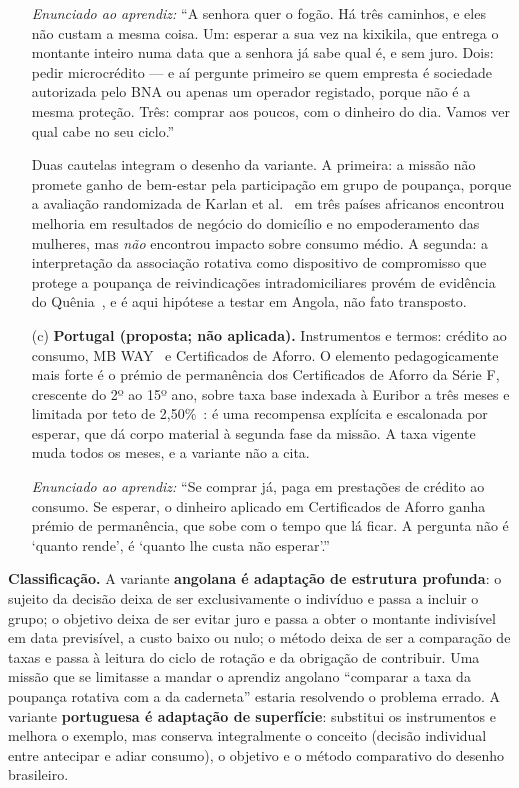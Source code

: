 \begin{enumerate}
\noindent\textit{Enunciado ao aprendiz:} ``A senhora quer o fogão. Há três caminhos, e eles não custam a mesma coisa. Um: esperar a sua vez na kixikila, que entrega o montante inteiro numa data que a senhora já sabe qual é, e sem juro. Dois: pedir microcrédito --- e aí pergunte primeiro se quem empresta é sociedade autorizada pelo BNA ou apenas um operador registado, porque não é a mesma proteção. Três: comprar aos poucos, com o dinheiro do dia. Vamos ver qual cabe no seu ciclo.''

Duas cautelas integram o desenho da variante. A primeira: a missão não promete ganho de bem-estar pela participação em grupo de poupança, porque a avaliação randomizada de Karlan et al.~\cite{karlan2017} em três países africanos encontrou melhoria em resultados de negócio do domicílio e no empoderamento das mulheres, mas \emph{não} encontrou impacto sobre consumo médio. A segunda: a interpretação da associação rotativa como dispositivo de compromisso que protege a poupança de reivindicações intradomiciliares provém de evidência do Quênia~\cite{anderson2002}, e é aqui hipótese a testar em Angola, não fato transposto.

\item[(c)] \textbf{Portugal (proposta; não aplicada).} Instrumentos e termos: crédito ao consumo, MB WAY~\cite{sibs_mbway} e Certificados de Aforro. O elemento pedagogicamente mais forte é o prémio de permanência dos Certificados de Aforro da Série F, crescente do 2º ao 15º ano, sobre taxa base indexada à Euribor a três meses e limitada por teto de 2,50\%~\cite{igcp_aforro}: é uma recompensa explícita e escalonada por esperar, que dá corpo material à segunda fase da missão. A taxa vigente muda todos os meses, e a variante não a cita.

\noindent\textit{Enunciado ao aprendiz:} ``Se comprar já, paga em prestações de crédito ao consumo. Se esperar, o dinheiro aplicado em Certificados de Aforro ganha prémio de permanência, que sobe com o tempo que lá ficar. A pergunta não é `quanto rende', é `quanto lhe custa não esperar'.''
\end{enumerate}

\noindent\textbf{Classificação.} A variante \textbf{angolana é adaptação de estrutura profunda}: o sujeito da decisão deixa de ser exclusivamente o indivíduo e passa a incluir o grupo; o objetivo deixa de ser evitar juro e passa a obter o montante indivisível em data previsível, a custo baixo ou nulo; o método deixa de ser a comparação de taxas e passa à leitura do ciclo de rotação e da obrigação de contribuir. Uma missão que se limitasse a mandar o aprendiz angolano ``comparar a taxa da poupança rotativa com a da caderneta'' estaria resolvendo o problema errado. A variante \textbf{portuguesa é adaptação de superfície}: substitui os instrumentos e melhora o exemplo, mas conserva integralmente o conceito (decisão individual entre antecipar e adiar consumo), o objetivo e o método comparativo do desenho brasileiro.

